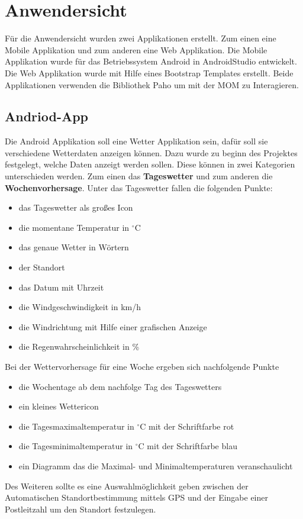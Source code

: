 \section{Anwendersicht}
Für die Anwendersicht wurden zwei Applikationen erstellt. Zum einen eine Mobile Applikation und zum anderen eine Web Applikation. Die Mobile Applikation wurde für das Betriebssystem Android in AndroidStudio entwickelt. Die Web Applikation wurde mit Hilfe eines Bootstrap Templates erstellt. Beide Applikationen verwenden die Bibliothek Paho um mit der MOM zu Interagieren.  
\subsection{Andriod-App}
Die Android Applikation soll eine Wetter Applikation sein, dafür soll sie verschiedene Wetterdaten anzeigen können. Dazu wurde zu beginn des Projektes festgelegt, welche Daten anzeigt werden sollen. Diese können in zwei Kategorien unterschieden werden. Zum einen das \textbf{Tageswetter} und zum anderen die \textbf{Wochenvorhersage}. Unter das Tageswetter fallen die folgenden Punkte: 
\begin{itemize}
\item das Tageswetter als großes Icon
\item die momentane Temperatur in $^\circ$C
\item das genaue Wetter in Wörtern
\item der Standort
\item das Datum mit Uhrzeit
\item die Windgeschwindigkeit in km/h
\item die Windrichtung mit Hilfe einer grafischen Anzeige
\item die Regenwahrscheinlichkeit in \%
\end{itemize}  
Bei der Wettervorhersage für eine Woche ergeben sich nachfolgende Punkte
\begin{itemize}
\item die Wochentage ab dem nachfolge Tag des Tageswetters
\item ein kleines Wettericon
\item die Tagesmaximaltemperatur in $^\circ$C mit der Schriftfarbe rot
\item die Tagesminimaltemperatur in $^\circ$C mit der Schriftfarbe blau
\item ein Diagramm das die Maximal- und Minimaltemperaturen veranschaulicht
\end{itemize}  
Des Weiteren sollte es eine Auswahlmöglichkeit geben zwischen der Automatischen Standortbestimmung mittels GPS und der Eingabe einer Postleitzahl um den Standort festzulegen.
